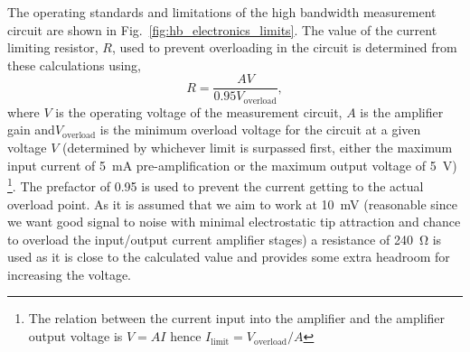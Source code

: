 \documentclass{article}
\begin{document}

The operating standards and limitations of the high bandwidth measurement circuit are shown in Fig.~\ref{fig:hb_electronics_limits}. The value of the current limiting resistor, $R$, used to prevent overloading in the circuit is determined from these calculations using,
\begin{equation}
R = \frac{AV}{0.95V_{\mathrm{overload}}},
\end{equation}
where $V$ is the operating voltage of the measurement circuit, $A$ is the amplifier gain and$V_{\mathrm{overload}}$ is the minimum overload voltage for the circuit at a given voltage $V$ (determined by whichever limit is surpassed first, either the maximum input current of \SI{5}{mA}  pre-amplification or the maximum output voltage of \SI{5}{V})
\footnote{The relation between the current input into the amplifier and the amplifier output voltage is $V = AI$ hence $I_{\mathrm{limit}} = V_{\mathrm{overload}}/A$}.
The prefactor of 0.95 is used to prevent the current getting to the actual overload point. As it is assumed that we aim to work at \SI{10}{mV} (reasonable since we want good signal to noise with minimal electrostatic tip attraction and chance to overload the input/output current amplifier stages) a resistance of \SI{240}{\ohm} is used as it is close to the calculated value and provides some extra headroom for increasing the voltage.
\end{document}
